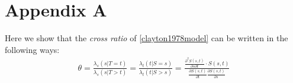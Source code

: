 \documentclass[]{article}
\begin{document}
%
%
%


%


\clearpage

\section{Appendix A} \label{appendixA}
Here we show that the \emph{cross ratio} of \ref{clayton1978model} can be written in the following ways:
	$$
	\begin{aligned}
	  \theta = \frac{ \lambda_s(s|T=t)}{\lambda_s(s|T>t)} = \frac{ \lambda_t(t|S=s)}{\lambda_t(t|S>s)} = \frac{ \frac{\partial^2 S(s, t)}{\partial s\partial t} \cdot S(s, t)}    {\frac{\partial S(s, t)}{\partial t} \frac{\partial S(s, t)}{\partial s}}
	\end{aligned}
	$$
\end{document}

